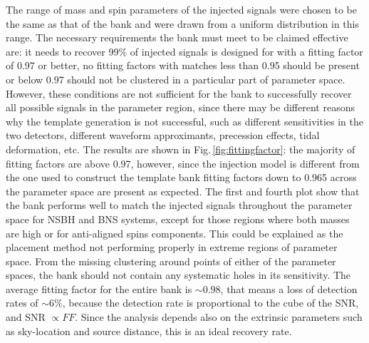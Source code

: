 \documentclass[binding=0.6cm, LaM]{sapthesis}
\begin{document}
	The range of mass and spin parameters of the injected signals were chosen 
	to be the same as that of the bank and were drawn from a uniform distribution in this range. 
	The necessary requirements the bank must meet to be claimed effective are: 
	it needs to recover 99\% of injected signals is designed for with a fitting factor of 0.97 or better,
	no fitting factors with matches less than 0.95 should be present or 
	below 0.97 should not be clustered in a particular part of parameter space. 
	However, these conditions are not sufficient for the bank to  successfully recover all possible signals in the parameter region,
	since there may be different reasons why the template generation is not successful, such as different sensitivities in the two detectors, 	
	different waveform approximants, precession effects, tidal deformation, etc.
	The results are shown in Fig.\,\ref{fig:fittingfactor}: 
	the majority of fitting factors are above 0.97, 
	however, since the injection model is different from the one used to construct the template bank
	fitting factors down to 0.965 across the parameter space are present as expected.
	The first and fourth plot show that the bank performs well to match the injected signals 
	throughout the parameter space for NSBH and BNS systems, 
	except for those regions where both masses are high or for anti-aligned spins components.
	This could be explained as the placement method not performing properly in extreme regions of parameter space.
	From the missing clustering around points of either of the parameter spaces,
	the bank should not contain any systematic holes in its sensitivity.
	The average fitting factor for the entire bank is $\sim0.98$, that means a loss of detection rates of $\sim6\%$,
	because the detection rate  is proportional to the cube of the SNR, and SNR $\propto FF$.
	Since the analysis depends also on the extrinsic parameters such as sky-location and source distance,
	this is an ideal recovery rate.
\end{document}
